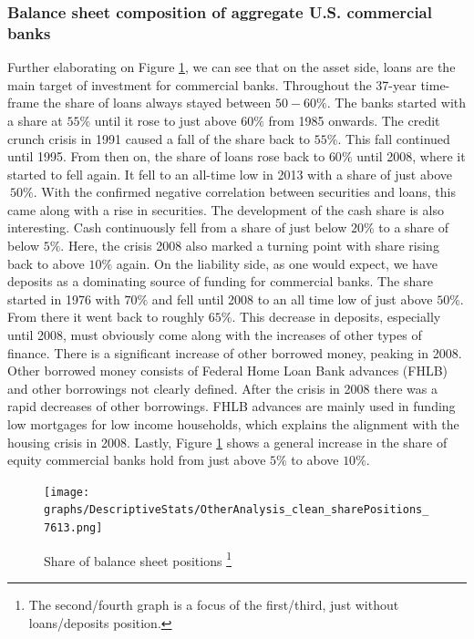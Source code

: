 \documentclass[12pt, a4paper]{article} %
\begin{document}
\subsubsection{Balance sheet composition of aggregate U.S. commercial banks}
Further elaborating on Figure \ref{fig:share_both}, we can see that on the asset side, loans are the main target of investment for commercial banks. Throughout the 37-year time-frame the share of loans always stayed between $50-60\%$. The banks started with a share at $55\%$ until it rose to just above $60\%$ from 1985 onwards. The credit crunch crisis in 1991 caused a fall of the share back to $55\%$. This fall continued until 1995. From then on, the share of loans rose back to $60\%$ until 2008, where it started to fell again. It fell to an all-time low in 2013 with a share of just above $~50\%$. With the confirmed negative correlation between securities and loans, this came along with a rise in securities. 
The development of the cash share is also interesting. Cash continuously fell from a share of just below $20\%$ to a share of below $5\%$. Here, the crisis 2008 also marked a turning point with share rising back to above $10\%$ again. 
On the liability side, as one would expect, we have deposits as a dominating source of funding for commercial banks. The share started in 1976 with $70\%$ and fell until 2008 to an all time low of just above $50\%$. From there it went back to roughly $65\%$. This decrease in deposits, especially until 2008, must obviously come along with the increases of other types of finance. There is a significant increase of other borrowed money, peaking in 2008. Other borrowed money consists of Federal Home Loan Bank advances (FHLB) and other borrowings not clearly defined. After the crisis in 2008 there was a rapid decreases of other borrowings. FHLB advances are mainly used in funding low mortgages for low income households, which explains the alignment with the housing crisis in 2008.  Lastly, Figure \ref{fig:share_both} shows a general increase in the share of equity commercial banks hold from just above $5\%$ to above $10\%$. 

\begin{figure}[hbtp]
\begin{minipage}{\textwidth}
\centering
\caption[1]{Share of balance sheet positions \footnote{The second/fourth graph is a focus of the first/third, just without loans/deposits position.} }
\texttt{[image: graphs/DescriptiveStats/OtherAnalysis\_clean\_sharePositions\_7613.png]}
\label{fig:share_both}
\end{minipage}
\end{figure}
 
\end{document}
